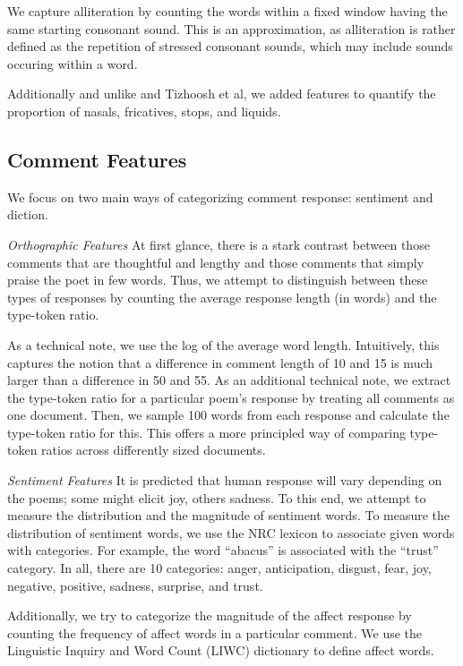\documentclass[11pt]{article}
\begin{document}
We capture alliteration by counting the words within a fixed window having the same starting consonant sound. This is an approximation, as alliteration is rather defined as the repetition of stressed consonant sounds, which may include sounds occuring within a word.

Additionally and unlike  and Tizhoosh et al, we added features to quantify the proportion of nasals, fricatives, stops, and liquids. 


\subsection*{Comment Features}
We focus on two main ways of categorizing comment response: sentiment and diction.

\emph{Orthographic Features}
At first glance, there is a stark contrast between those comments that are thoughtful and lengthy and those comments that simply praise the poet in few words. Thus, we attempt to distinguish between these types of responses by counting the average response length (in words) and the type-token ratio.

As a technical note, we use the log of the average word length. Intuitively, this captures the notion that a difference in comment length of 10 and 15 is much larger than a difference in 50 and 55. As an additional technical note, we extract the type-token ratio for a particular poem's response by treating all comments as one document. Then, we sample 100 words from each response and calculate the type-token ratio for this. This offers a more principled way of comparing type-token ratios across differently sized documents.

\emph{Sentiment Features}
It is predicted that human response will vary depending on the poems; some might elicit joy, others sadness. To this end, we attempt to measure the distribution and the magnitude of sentiment words. To measure the distribution of sentiment words, we use the NRC lexicon to associate given words with categories. For example, the word ``abacus'' is associated with the ``trust'' category. In all, there are 10 categories: anger, anticipation, disgust, fear, joy, negative, positive, sadness, surprise, and trust.

Additionally, we try to categorize the magnitude of the affect response by counting the frequency of affect words in a particular comment. We use the Linguistic Inquiry and Word Count (LIWC) dictionary to define affect words.
\end{document}
